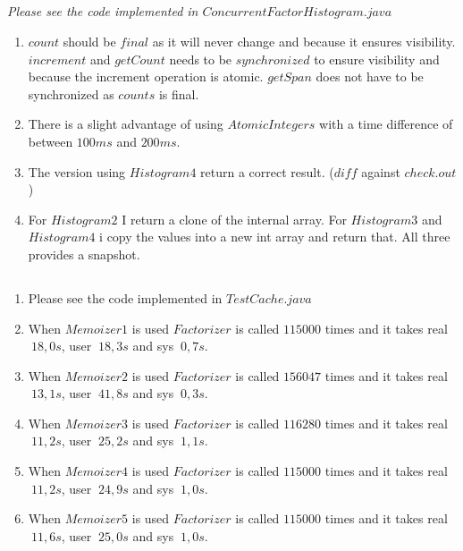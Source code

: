 \documentclass{tufte-handout}
\newcommand{\skipitem}{%
\stepcounter{enumi}
}
\begin{document}
\subsection{}
\textit{Please see the code implemented in $ConcurrentFactorHistogram.java$}
\begin{enumerate}
\item $count$ should be $final$ as it will never change and because it ensures visibility. $increment$ and $getCount$ needs to be $synchronized$ to ensure visibility and because the increment operation is atomic. $getSpan$ does not have to be synchronized as $counts$ is final.
\skipitem
\item There is a slight advantage of using $AtomicIntegers$ with a time difference of between $100ms$ and $200ms$. 
\item The version using $Histogram4$ return a correct result. ($diff$ against $check.out$)
\item For $Histogram2$ I return a clone of the internal array. For $Histogram3$ and $Histogram4$ i copy the values into a new int array and return that. All three provides a snapshot.
\end{enumerate}

\subsection{}
\begin{enumerate}
\item Please see the code implemented in $TestCache.java$
\item When $Memoizer1$ is used $Factorizer$ is called $115000$ times and it takes real $~18,0s$, user $~18,3s$ and sys $~0,7s$.
\item When $Memoizer2$ is used $Factorizer$ is called $156047$ times and it takes real $~13,1s$, user $~41,8s$ and sys $~0,3s$.
\item When $Memoizer3$ is used $Factorizer$ is called $116280$ times and it takes real $~11,2s$, user $~25,2s$ and sys $~1,1s$.
\item When $Memoizer4$ is used $Factorizer$ is called $115000$ times and it takes real $~11,2s$, user $~24,9s$ and sys $~1,0s$.
\item When $Memoizer5$ is used $Factorizer$ is called $115000$ times and it takes real $~11,6s$, user $~25,0s$ and sys $~1,0s$.
\end{enumerate}
\end{document}

